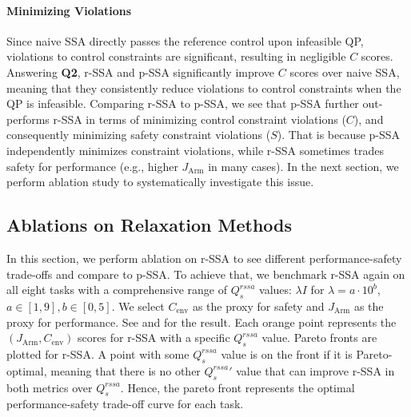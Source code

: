 \paragraph{Minimizing Violations}

Since naive SSA directly passes the reference control upon infeasible QP, violations to control constraints are significant, resulting in negligible $C$ scores. 
Answering \textbf{Q2}, r-SSA and p-SSA significantly improve $C$ scores over naive SSA, meaning that they consistently reduce violations to control constraints when the QP is infeasible.
Comparing r-SSA to p-SSA, we see that p-SSA further out-performs r-SSA in terms of minimizing control constraint violations ($C$), and consequently minimizing safety constraint violations ($S$).
That is because p-SSA independently minimizes constraint violations, while r-SSA sometimes trades safety for performance (e.g., higher $J_\mathrm{Arm}$ in many cases).
In the next section, we perform ablation study to systematically investigate this issue.





\subsection{Ablations on Relaxation Methods}

In this section, we perform ablation on r-SSA to see different performance-safety trade-offs and compare to p-SSA.
To achieve that, we benchmark r-SSA again on all eight tasks with a comprehensive range of $Q_s^{rssa}$ values: $\lambda I$ for $\lambda=a\cdot 10^b$, $a\in[1,9],b\in[0,5]$.
We select $C_\mathrm{env}$ as the proxy for safety and $J_\mathrm{Arm}$ as the proxy for performance.
See  and  for the result.
Each orange point represents the $(J_\mathrm{Arm}, C_\mathrm{env})$ scores for r-SSA with a specific $Q_s^{rssa}$ value.
Pareto fronts are plotted for r-SSA.
A point with some $Q_s^{rssa}$ value is on the front if it is Pareto-optimal, meaning that there is no other ${Q_s^{rssa}}'$ value that can improve r-SSA in both metrics over $Q_s^{rssa}$.
Hence, the pareto front represents the optimal performance-safety trade-off curve for each task.

